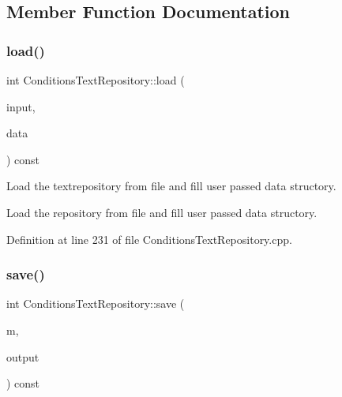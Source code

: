 \subsection{Member Function Documentation}
\hypertarget{class_d_d4hep_1_1_conditions_1_1_conditions_text_repository_ad86a6e20ad5937702cad0cd98f3e19e8}{}\label{class_d_d4hep_1_1_conditions_1_1_conditions_text_repository_ad86a6e20ad5937702cad0cd98f3e19e8} 
\subsubsection{\texorpdfstring{load()}{load()}}
{\footnotesize\ttfamily int Conditions\+Text\+Repository\+::load (\begin{DoxyParamCaption}\item[{const std\+::string \&}]{input,  }\item[{\hyperlink{class_d_d4hep_1_1_conditions_1_1_conditions_text_repository_afe5d8989bf0bcd711e59f838943b5115}{Data} \&}]{data }\end{DoxyParamCaption}) const}



Load the textrepository from file and fill user passed data structory. 

Load the repository from file and fill user passed data structory. 

Definition at line 231 of file Conditions\+Text\+Repository.\+cpp.

\hypertarget{class_d_d4hep_1_1_conditions_1_1_conditions_text_repository_a49a8e0cd212ea286f16c2a600d7da048}{}\label{class_d_d4hep_1_1_conditions_1_1_conditions_text_repository_a49a8e0cd212ea286f16c2a600d7da048} 
\subsubsection{\texorpdfstring{save()}{save()}}
{\footnotesize\ttfamily int Conditions\+Text\+Repository\+::save (\begin{DoxyParamCaption}\item[{\hyperlink{class_d_d4hep_1_1_conditions_1_1_conditions_manager}{Conditions\+Manager}}]{m,  }\item[{const std\+::string \&}]{output }\end{DoxyParamCaption}) const}



